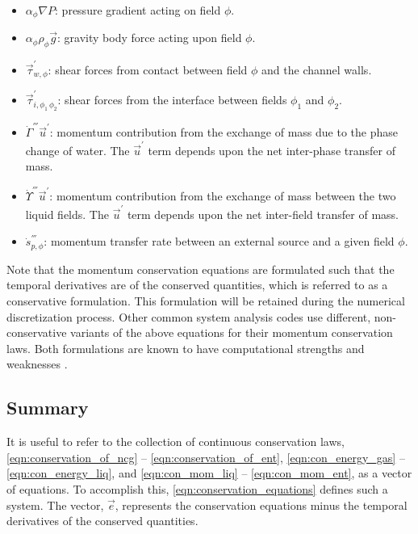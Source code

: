 \begin{itemize}
\item{
$\alpha_{\phi} \nabla P$:
pressure gradient acting on field $\phi$.
}
\item{
$\alpha_{\phi} \rho_{\phi} \vec{g}$:
gravity body force acting upon field $\phi$.
}
\item{
$\vec{\tau}^{'}_{w,\phi}$:
 shear forces from contact between field $\phi$ and the channel walls. 
}
\item{
$\vec{\tau}^{'}_{i,\phi_1\,\phi_2}$:
 shear forces from the interface between fields $\phi_1$ and $\phi_2$. 
}
\item{
$\dot{\Gamma}^{'''}\vec{u}^{'}$:
 momentum contribution from the exchange of mass due to the phase change of water.
 The $\vec{u}^{'}$ term depends upon the net inter-phase transfer of mass.
}
\item{
$\dot{\Upsilon}^{'''}\vec{u}^{'}$:
 momentum contribution from the exchange of mass between the two liquid fields.
 The $\vec{u}^{'}$ term depends upon the net inter-field transfer of mass.
}
\item{
$\dot{s}^{'''}_{p,\phi}$:
 momentum transfer rate between an external source and a given field $\phi$.
}
\end{itemize}

Note that the momentum conservation equations are formulated such that the temporal derivatives are of the conserved quantities, which is referred to as a conservative formulation.
This formulation will be retained during the numerical discretization process.
Other common system analysis codes \cite{TRACE, RELAP} use different, non-conservative variants of the above equations for their momentum conservation laws.
Both formulations are known to have computational strengths and weaknesses \cite{Park2009a}.

\subsection{Summary}
\label{subsect:summary}

It is useful to refer to the collection of continuous conservation laws, \eqref{eqn:conservation_of_ncg} -- \eqref{eqn:conservation_of_ent}, \eqref{eqn:con_energy_gas} -- \eqref{eqn:con_energy_liq}, and \eqref{eqn:con_mom_liq} -- \eqref{eqn:con_mom_ent}, as a vector of equations.
To accomplish this, \eqref{eqn:conservation_equations} defines such a system.
The vector, $\vec{e}$, represents the conservation equations minus the temporal derivatives of the conserved quantities.

